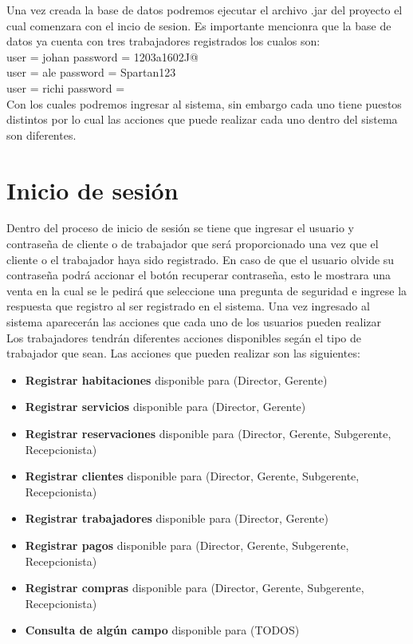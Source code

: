 \documentclass[12pt]{article}
\begin{document}
\begin{flushleft}
\textsf{Una vez creada la base de datos podremos ejecutar el archivo .jar del proyecto el cual comenzara con el incio de sesion. Es importante mencionra que la base de datos ya cuenta con tres trabajadores registrados los cualos son:\\
user = johan  password = 1203a1602J@\\
user = ale  password = Spartan123\\
user = richi password = \\
Con los cuales podremos ingresar al sistema, sin embargo cada uno tiene puestos distintos por lo cual las acciones que puede realizar cada uno dentro del sistema son diferentes.}

\section{Inicio de sesión}
\textsf{Dentro del proceso de inicio de sesión se tiene que ingresar el usuario y contraseña de cliente o de trabajador que será proporcionado una vez que el cliente o el trabajador haya sido registrado. En caso de que el usuario olvide su contraseña podrá accionar el botón recuperar contraseña, esto le mostrara una venta en la cual se le pedirá que seleccione una pregunta de seguridad e ingrese la respuesta que registro al ser registrado en el sistema.  Una vez ingresado al sistema aparecerán las acciones que cada uno de los usuarios pueden realizar\vspace{0.5cm} \\Los trabajadores tendrán diferentes acciones disponibles segán el tipo de trabajador que sean. Las acciones que pueden realizar son las siguientes: }

\vspace{0.5cm} 

\begin{itemize}
\item{\textbf{Registrar habitaciones } disponible para (Director, Gerente)}
\item{\textbf{Registrar servicios} disponible para (Director, Gerente)}
\item{\textbf{Registrar reservaciones }disponible para (Director, Gerente, Subgerente, Recepcionista)}
\item{\textbf{Registrar clientes } disponible para (Director, Gerente, Subgerente, Recepcionista)}
\item{\textbf{Registrar trabajadores} disponible para (Director, Gerente)}
\item{\textbf{Registrar pagos } disponible para (Director, Gerente, Subgerente, Recepcionista)}
\item{\textbf{Registrar compras } disponible para (Director, Gerente, Subgerente, Recepcionista)}
\item{\textbf{Consulta  de algún campo} disponible para (TODOS)}
\end{itemize}


\end{flushleft}
\end{document}

